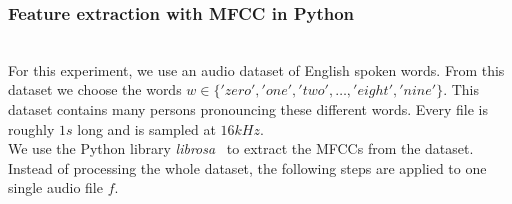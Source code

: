 
\subsubsection{Feature extraction with MFCC in Python}~\label{librosa}~\\


For this experiment, we use an audio dataset of English spoken
words\cite{DBLP:journals/corr/abs-1804-03209}. From this dataset we choose the
words $w \in \{'zero', 'one', 'two', \dots , 'eight', 'nine'\}$. This dataset
contains many persons pronouncing these different words.  Every file is roughly
$1s$ long and is sampled at $16kHz$.\\

We use the Python library \textit{librosa}~\cite{librosa} to extract the MFCCs from the
dataset. Instead of processing the whole dataset, the following steps are
applied to one single audio file $f$.\\

